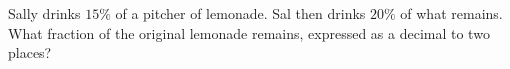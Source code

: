 Sally drinks $15\%$ of a pitcher of lemonade. Sal then drinks $20\%$ of what remains. What fraction of the original lemonade remains, expressed as a decimal to two places?
